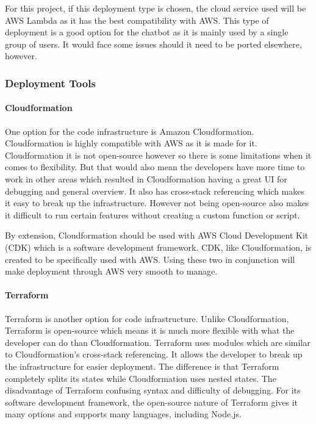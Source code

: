 For this project, if this deployment type is chosen, the cloud service used will be AWS Lambda as it has the best compatibility with AWS. 
This type of deployment is a good option for the chatbot as it is mainly used by a single group of users.
It would face some issues should it need to be ported elsewhere, however.

\subsubsection{Deployment Tools}
\paragraph{Cloudformation}
One option for the code infrastructure is Amazon Cloudformation. 
Cloudformation is highly compatible with AWS as it is made for it.
Cloudformation it is not open-source however so there is some limitations when it comes to flexibility.
But that would also mean the developers have more time to work in other areas which resulted in Cloudformation having a great UI for debugging and general overview. 
It also has cross-stack referencing which makes it easy to break up the infrastructure. However not being open-source also makes it difficult to run certain features without creating a custom function or script.

By extension, Cloudformation should be used with AWS Cloud Development Kit (CDK) which is a software development framework. 
CDK, like Cloudformation, is created to be specifically used with AWS. 
Using these two in conjunction will make deployment through AWS very smooth to manage.

\paragraph{Terraform}
Terraform is another option for code infrastructure. 
Unlike Cloudformation, Terraform is open-source which means it is much more flexible with what the developer can do than Cloudformation. 
Terraform uses modules which are similar to Cloudformation's cross-stack referencing. 
It allows the developer to break up the infrastructure for easier deployment. The difference is that Terraform completely splits its states while Cloudformation uses nested states. 
The disadvantage of Terraform confusing syntax and difficulty of debugging.
For its software development framework, the open-source nature of Terraform gives it many options and supports many languages, including Node.js.
    
